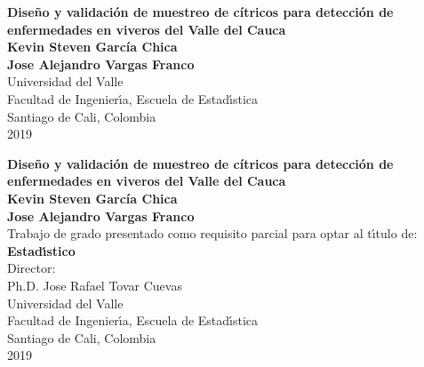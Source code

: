 
\begin{center}
\begin{figure}
\centering
{}
\end{figure}

\thispagestyle{empty}
\vspace*{2.0cm}

\textbf{\huge Dise\~{n}o y validaci\'{o}n de muestreo de c\'{i}tricos para detecci\'{o}n de enfermedades en viveros del Valle del Cauca}\\[5.0cm]

\Large\textbf{Kevin Steven Garc\'{i}a Chica}\\
\Large\textbf{Jose Alejandro Vargas Franco}\\[4.0cm]
\small Universidad del Valle\\
Facultad de Ingenier\'{\i}a, Escuela de Estad\'{\i}stica\\
Santiago de Cali, Colombia\\
2019\\
\end{center}

\newpage{\pagestyle{empty}\cleardoublepage}

\newpage

\begin{center}
\thispagestyle{empty}
\vspace*{0cm}

\textbf{\huge Dise\~{n}o y validaci\'{o}n de muestreo de c\'{i}tricos para detecci\'{o}n de enfermedades en viveros del Valle del Cauca}\\[3.5cm]

\Large\textbf{Kevin Steven Garc\'{i}a Chica}\\
\Large\textbf{Jose Alejandro Vargas Franco}\\[3.0cm]
\small Trabajo de grado presentado como requisito parcial para optar al t\'{\i}tulo de:\\
\textbf{Estad\'{\i}stico}\\[2.5cm]
Director:\\
Ph.D. Jose Rafael Tovar Cuevas\\[4.0cm]
Universidad del Valle\\
Facultad de Ingenier\'{\i}a, Escuela de Estad\'{\i}stica\\
Santiago de Cali, Colombia\\
2019\\
\end{center}

